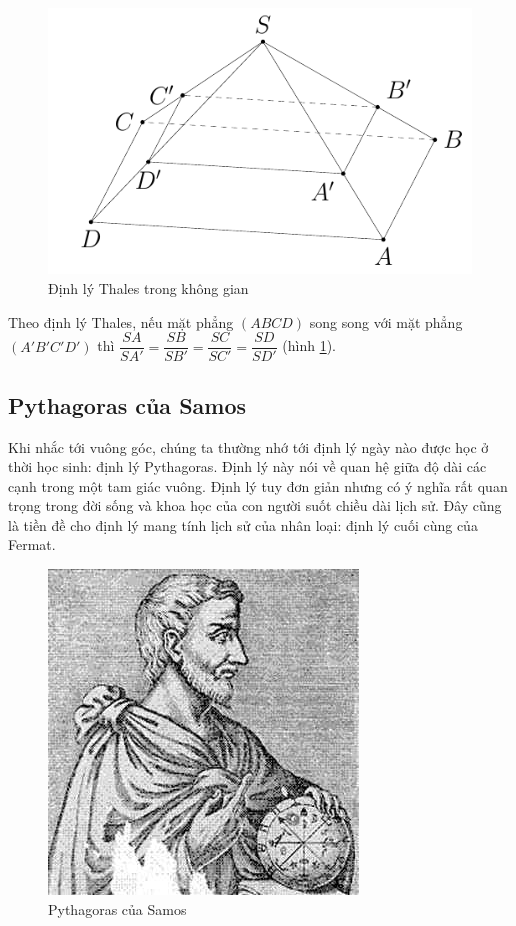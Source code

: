 \begin{figure}[ht]
	\centering
	\includegraphics{analytic_geometry/thales2.pdf}
	\caption{Định lý Thales trong không gian}
	\label{thales2}
\end{figure}

Theo định lý Thales, nếu mặt phẳng $(ABCD)$ song song với mặt phẳng $(A'B'C'D')$ thì $\dfrac{SA}{SA'} = \dfrac{SB}{SB'} = \dfrac{SC}{SC'} = \dfrac{SD}{SD'}$ (hình \ref{thales2}).

\subsection*{Pythagoras của Samos}

Khi nhắc tới vuông góc, chúng ta thường nhớ tới định lý ngày nào được học ở thời học sinh: định lý Pythagoras. Định lý này nói về quan hệ giữa độ dài các cạnh trong một tam giác vuông. Định lý tuy đơn giản nhưng có ý nghĩa rất quan trọng trong đời sống và khoa học của con người suốt chiều dài lịch sử. Đây cũng là tiền đề cho định lý mang tính lịch sử của nhân loại: định lý cuối cùng của Fermat.

\begin{figure}[ht]
	\centering
	\includegraphics[scale=0.5]{analytic_geometry/Pythagoras.jpeg}
	\captionsetup{labelformat=empty}
	\caption{Pythagoras của Samos}
\end{figure}

